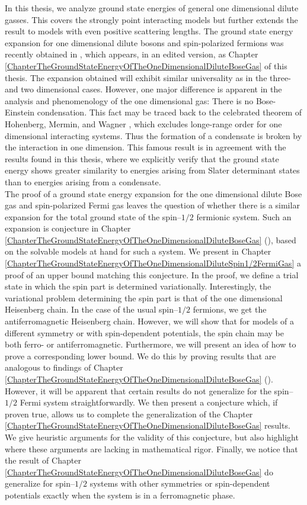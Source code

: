 In this thesis, we analyze ground state energies of general one dimensional dilute gasses. This covers the strongly point interacting models but further extends the result to models with even positive scattering lengths. The ground state energy expansion for one dimensional dilute bosons and spin-polarized fermions was recently obtained in \cite{agerskov2022ground}, which appears, in an edited version, as Chapter \ref{ChapterTheGroundStateEnergyOfTheOneDimensionalDiluteBoseGas} of this thesis. The expansion obtained will exhibit similar universality as in the three- and two dimensional cases. However, one major difference is apparent in the analysis and phenomenology of the one dimensional gas: There is no Bose-Einstein condensation. This fact may be traced back to the celebrated theorem of Hohenberg, Mermin, and Wagner \cite{hohenberg1967existence,mermin1966absence}, which excludes longe-range order for one dimensional interacting systems. Thus the formation of a condensate is broken by the interaction in one dimension. This famous result is in agreement with the results found in this thesis, where we explicitly verify that the ground state energy shows greater similarity to energies arising from Slater determinant states than to energies arising from a condensate.\\
The proof of a ground state energy expansion for the one dimensional dilute Bose gas and spin-polarized Fermi gas leaves the question of whether there is a similar expansion for the total ground state of the spin--$ 1/2 $ fermionic system. Such an expansion is conjecture in Chapter \ref{ChapterTheGroundStateEnergyOfTheOneDimensionalDiluteBoseGas} (\cite{agerskov2022ground}), based on the solvable models at hand for such a system. We present in Chapter \ref{ChapterTheGroundStateEnergyOfTheOneDimensionalDiluteSpin1/2FermiGas} a proof of an upper bound matching this conjecture. In the proof, we define a trial state in which the spin part is determined variationally. Interestingly, the variational problem determining the spin part is that of the one dimensional Heisenberg chain. In the case of the usual spin--$ 1/2 $ fermions, we get the antiferromagnetic Heisenberg chain. However, we will show that for models of a different symmetry or with spin-dependent potentials, the spin chain may be both ferro- or antiferromagnetic. Furthermore, we will present an idea of how to prove a corresponding lower bound. We do this by proving results that are analogous to findings of Chapter \ref{ChapterTheGroundStateEnergyOfTheOneDimensionalDiluteBoseGas} (\cite{agerskov2022ground}). However, it will be apparent that certain results do not generalize for the spin--$ 1/2 $ Fermi system straightforwardly. We then present a conjecture which, if proven true, allows us to complete the generalization of the Chapter \ref{ChapterTheGroundStateEnergyOfTheOneDimensionalDiluteBoseGas} results. We give heuristic arguments for the validity of this conjecture, but also highlight where these arguments are lacking in mathematical rigor. Finally, we notice that the result of Chapter \ref{ChapterTheGroundStateEnergyOfTheOneDimensionalDiluteBoseGas} do generalize for spin--$ 1/2 $ systems with other symmetries or spin-dependent potentials exactly when the system is in a ferromagnetic phase.\\


